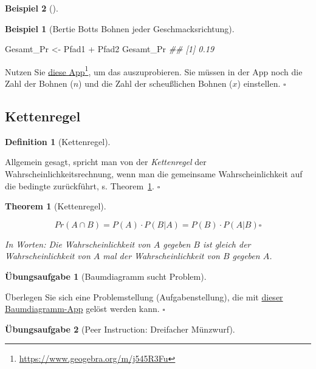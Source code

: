 \documentclass[
  ngerman,
  letterpaper,
  twoside,
  open=any]{scrbook}
\newenvironment{Shaded}{\begin{snugshade}}{\end{snugshade}}
\newcommand{\DocumentationTok}[1]{\textcolor[rgb]{0.37,0.37,0.37}{\textit{#1}}}
\newcommand{\NormalTok}[1]{\textcolor[rgb]{0.00,0.23,0.31}{#1}}
\newcommand{\OtherTok}[1]{\textcolor[rgb]{0.00,0.23,0.31}{#1}}
\newcommand{\SpecialCharTok}[1]{\textcolor[rgb]{0.37,0.37,0.37}{#1}}
\theoremstyle{definition}
\newtheorem{example}{Beispiel}[chapter]
\theoremstyle{plain}
\newtheorem{theorem}{Theorem}[chapter]
\theoremstyle{definition}
\newtheorem{exercise}{Übungsaufgabe}[chapter]
\theoremstyle{definition}
\newtheorem{definition}{Definition}[chapter]
\theoremstyle{remark}
\begin{document}
\begin{example}[]
\begin{example}[Bertie Botts Bohnen jeder
Geschmacksrichtung]
\begin{Shaded}
\begin{Highlighting}[]
\NormalTok{Gesamt\_Pr }\OtherTok{\textless{}{-}}\NormalTok{ Pfad1 }\SpecialCharTok{+}\NormalTok{ Pfad2 }
\NormalTok{Gesamt\_Pr}
\DocumentationTok{\#\# [1] 0.19}
\end{Highlighting}
\end{Shaded}

Nutzen Sie \href{https://www.geogebra.org/m/j545R3Fu}{diese
App}\footnote{\url{https://www.geogebra.org/m/j545R3Fu}}, um das
auszuprobieren. Sie müssen in der App noch die Zahl der Bohnen (\(n\))
und die Zahl der scheußlichen Bohnen (\(x\)) einstellen. \(\square\)

\end{example}

\subsection{Kettenregel}\label{kettenregel}

\begin{definition}[Kettenregel]\protect\hypertarget{def-kettenregel}{}\label{def-kettenregel}

Allgemein gesagt, spricht man von der \emph{Kettenregel} der
Wahrscheinlichkeitsrechnung, wenn man die gemeinsame Wahrscheinlichkeit
auf die bedingte zurückführt, s. Theorem~\ref{thm-kette}. \(\square\)

\end{definition}

\begin{theorem}[Kettenregel]\protect\hypertarget{thm-kette}{}\label{thm-kette}

\[Pr(A\cap B) = P(A) \cdot P(B|A) = P(B) \cdot P(A|B) \square\]

In Worten: Die Wahrscheinlichkeit von \(A\) gegeben \(B\) ist gleich der
Wahrscheinlichkeit von \(A\) mal der Wahrscheinlichkeit von \(B\)
gegeben \(A\).

\end{theorem}

\begin{exercise}[Baumdiagramm sucht
Problem]\protect\hypertarget{exr-baum3}{}\label{exr-baum3}

Überlegen Sie sich eine Problemstellung (Aufgabenstellung), die mit
\href{https://www.geogebra.org/m/WVKur4yM}{dieser Baumdiagramm-App}
gelöst werden kann. \(\square\)

\end{exercise}

\begin{exercise}[Peer Instruction: Dreifacher
Münzwurf]\protect\hypertarget{exr-multsatz}{}\label{exr-multsatz}


\end{exercise}
\end{example}
\end{document}
